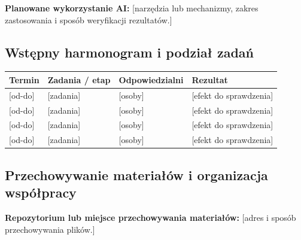 \documentclass[11pt,a4paper,oneside]{article}
\newif\ifpodpowiedzi
\newcommand{\podpowiedz}[1]{\ifpodpowiedzi\par\begingroup\small\color{hintcolor}\textit{Wskazówka: #1}\par\endgroup\fi}
\newcommand{\pole}[1]{\textnormal{[#1]}}
\begin{document}
\podpowiedz{Jeżeli przewidujecie wykorzystanie AI, określcie, czy ma wspomagać prace, stanowić część rozwiązania, czy pełnić obie role. Jeśli AI jest elementem wymagań projektu, wskażcie sposób oceny jej działania. Gdy nie planujecie AI, wpiszcie tę informację.}
\textbf{Planowane wykorzystanie AI:} \pole{narzędzia lub mechanizmy, zakres zastosowania i sposób weryfikacji rezultatów.}

\subsection{Wstępny harmonogram i podział zadań}
\podpowiedz{Podziel prace na etapy z konkretnymi terminami i sprawdzalnymi rezultatami. Wskaż osoby odpowiedzialne; przy zadaniach wspólnych określ indywidualne obowiązki. Uwzględnij czas na integrację, testy, dokumentację, nagranie i poprawki. W razie potrzeby dodaj wiersze.}
\begin{tabularx}{\textwidth}{@{}p{} Y p{0.21\textwidth} Y@{}}
\toprule
Termin & Zadania / etap & Odpowiedzialni & Rezultat\\
\midrule
\pole{od-do} & \pole{zadania} & \pole{osoby} & \pole{efekt do sprawdzenia}\\
\pole{od-do} & \pole{zadania} & \pole{osoby} & \pole{efekt do sprawdzenia}\\
\pole{od-do} & \pole{zadania} & \pole{osoby} & \pole{efekt do sprawdzenia}\\
\pole{od-do} & \pole{zadania} & \pole{osoby} & \pole{efekt do sprawdzenia}\\
\bottomrule
\end{tabularx}
\podpowiedz{Od trzeciego spotkania przygotowujcie wspólny raport za okres między poprzednim a bieżącym spotkaniem, z podziałem wykonanych prac na członków zespołu.}

\newpage
\subsection{Przechowywanie materiałów i organizacja współpracy}

\podpowiedz{W projekcie programistycznym podaj adres repozytorium kodu. W projekcie o innym charakterze, np. animacji 3D, wskaż uzgodnione z prowadzącymi miejsce przechowywania plików źródłowych, zasobów i rezultatów. Opisz sposób oznaczania kolejnych wersji i zapewnij dostęp obojgu prowadzącym.}

\textbf{Repozytorium lub miejsce przechowywania materiałów:}
\pole{adres i sposób przechowywania plików.}\par
\end{document}
